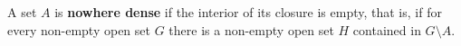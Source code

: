 A set $A$ is \textbf{nowhere dense} if the interior of its closure is empty, that is, if for every non-empty open set $G$ there is a non-empty open set $H$ contained in $G \setminus A$.
